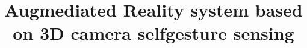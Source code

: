 \documentclass[conference]{IEEEtran}
\begin{document}
%
\title{Augmediated Reality system based on 3D camera selfgesture sensing}


\author{ \and
{} \and
{}}


% 
\end{document}
